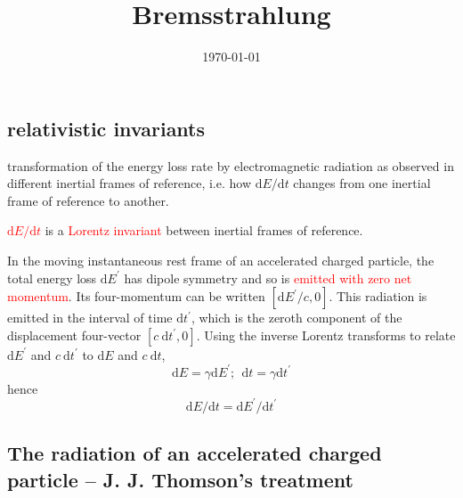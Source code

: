 \documentclass[12pt,a4paper]{article}
\title{Bremsstrahlung}
\author{}
\date{\today}
\newcommand{\dif}{\mathrm{d}}
\begin{document}
\maketitle

\subsection{relativistic invariants}
transformation of the energy loss rate by electromagnetic radiation as observed in different inertial frames of reference, i.e. how $\dif E/\dif t$ changes from one inertial frame of reference to another.

\textcolor{red}{$\dif E/\dif t$} is a \textcolor{red}{Lorentz invariant} between inertial frames of reference.

In the moving instantaneous rest frame of an accelerated charged particle, the total energy loss $\dif E^{\prime}$ has dipole symmetry and so is \textcolor{red}{emitted with zero net momentum}. Its four-momentum can be written $[\dif E^{\prime}/c, 0]$. This radiation is emitted in the interval of time $\dif t^{\prime}$, which is the zeroth component of the displacement four-vector $[c ~\dif t^{\prime}, 0]$. Using the inverse Lorentz transforms to relate $\dif E^{\prime}$ and $c ~\dif t^{\prime}$ to $\dif E$ and $c~ \dif t$,
\begin{equation}
\dif E = \gamma \dif E^{\prime} ; ~~ \dif t = \gamma \dif t^{\prime}
\end{equation}
hence
\begin{equation}
\dif E/\dif t  = \dif E^{\prime}/\dif t^{\prime}
\end{equation}


\subsection{The radiation of an accelerated charged particle – J. J. Thomson’s treatment}
\end{document}
